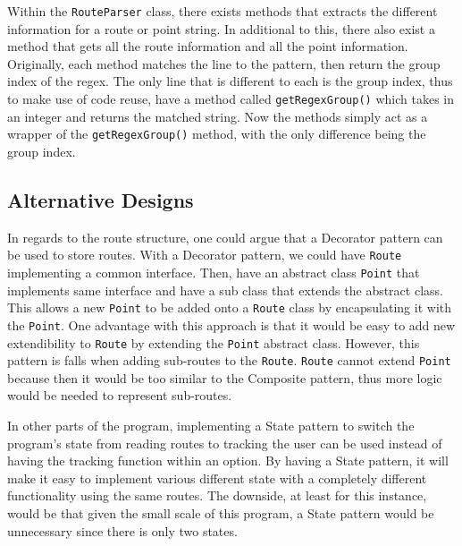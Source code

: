 \documentclass[a4paper, 12pt, titlepage]{article}
\newcommand{\code}[1]{\small\texttt{#1}\normalsize}
\begin{document}
Within the \code{RouteParser} class, there exists methods that extracts the
different information for a route or point string. In additional to this, there
also exist a method that gets all the route information and all the point
information. Originally, each method matches the line to the pattern, then
return the group index of the regex. The only line that is different to each is
the group index, thus to make use of code reuse, have a method called
\code{getRegexGroup()} which takes in an integer and returns the matched
string. Now the methods simply act as a wrapper of the \code{getRegexGroup()}
method, with the only difference being the group index.


\subsection{Alternative Designs}

In regards to the route structure, one could argue that a Decorator pattern can
be used to store routes. With a Decorator pattern, we could have \code{Route}
implementing a common interface. Then, have an abstract class \code{Point} that
implements same interface and have a sub class that extends the abstract class.
This allows a new \code{Point} to be added onto a \code{Route} class by
encapsulating it with the \code{Point}. One advantage with this approach is
that it would be easy to add new extendibility to \code{Route} by extending the
\code{Point} abstract class. However, this pattern is falls when adding
sub-routes to the \code{Route}. \code{Route} cannot extend \code{Point} because
then it would be too similar to the Composite pattern, thus more logic would be
needed to represent sub-routes.

In other parts of the program, implementing a State pattern to switch the
program's state from reading routes to tracking the user can be used instead of
having the tracking function within an option. By having a State pattern, it
will make it easy to implement various different state with a completely
different functionality using the same routes. The downside, at least for this
instance, would be that given the small scale of this program, a State pattern
would be unnecessary since there is only two states.
\end{document}
